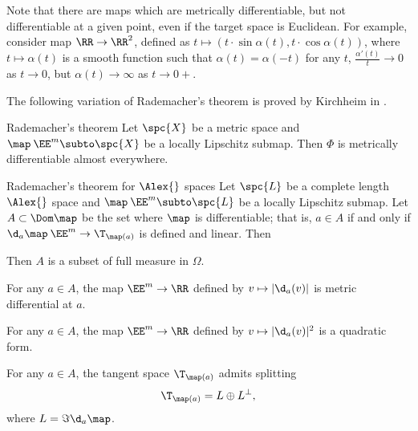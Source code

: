 Note that there are maps which are metrically differentiable,
but not differentiable at a given point,
even if the target space is Euclidean.
For example, consider map $\RR\to\RR^2$,
defined as $t\mapsto (t\cdot\sin\alpha(t), t\cdot\cos\alpha(t))$,
where $t\mapsto \alpha(t)$ is a smooth function such that 
$\alpha(t)=\alpha(-t)$ for any $t$,
$\tfrac{\alpha'(t)}t\to 0$ as $t\to 0$, 
but $\alpha(t)\to \infty$ as $t\to 0+$.

The following variation of Rademacher's theorem 
is proved by Kirchheim in \cite{kirchheim}.

\begin{thm}{Rademacher's theorem}\label{thm:rademacher}
Let $\spc{X}$ be a metric space 
and $\map\:\EE^m\subto\spc{X}$ be a locally Lipschitz submap.
Then $\Phi$ is metrically differentiable almost everywhere.
\end{thm}


\qeds

\begin{thm}{Rademacher's theorem for $\Alex{}$ spaces}
Let $\spc{L}$ be a complete length $\Alex{}$ space 
and $\map\:\EE^m\subto\spc{L}$ be a locally Lipschitz submap.
Let $A\subset \Dom \map$ be the set where $\map$ is differentiable;
that is, $a\in A$ if and only if $\d_a\map\:\EE^m\to\T_{\map(a)}$ is defined and linear.
Then 
\begin{subthm}{}
Then $A$ is a subset of full measure in $\Omega$.
\end{subthm}

\begin{subthm}{}
For any $a\in A$,
the map $\EE^m\to\RR$ defined by $v\mapsto |\d_a(v)|$ is metric differential at $a$.
\end{subthm}

\begin{subthm}{}
For any $a\in A$,
the map $\EE^m\to\RR$ defined by $v\mapsto |\d_a(v)|^2$ is a quadratic form.
\end{subthm}

\begin{subthm}{}
For any $a\in A$, the tangent space
$\T_{\map(a)}$ admits splitting
\[\T_{\map(a)}=L\oplus L^\bot,\]
where $L=\Im\d_a\map$.
\end{subthm}
\end{thm}

